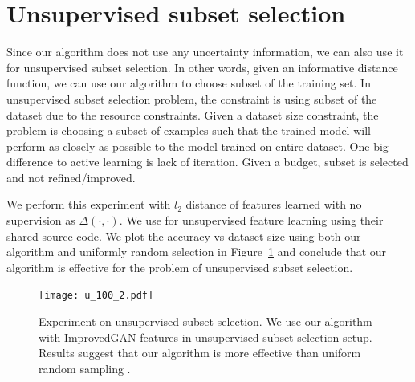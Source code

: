 \documentclass{article}
\begin{document}
 


\appendix

\section{Unsupervised subset selection} 

Since our algorithm does not use any uncertainty information, we can also use it for unsupervised subset selection. In other words, given an informative distance function, we can use our algorithm to choose subset of the training set. In unsupervised subset selection problem, the constraint is using subset of the dataset due to the resource constraints. Given a dataset size constraint, the problem is choosing a subset of examples such that the trained model will perform as closely as possible to the model trained on entire dataset. One big difference to active learning is lack of iteration. Given a budget, subset is selected and not refined/improved.


We perform this experiment with $l_2$ distance of features learned with no supervision as $\Delta(\cdot,\cdot)$. We use \cite{improved_gan} for unsupervised feature learning using their shared source code. We plot the accuracy vs dataset size using both our algorithm and uniformly random selection in Figure~\ref{fig:scat} and conclude that our algorithm is effective for the problem of unsupervised subset selection.  

\begin{figure}
\texttt{[image: u\_100\_2.pdf]}
\caption{Experiment on unsupervised subset selection. We use our algorithm with ImprovedGAN\cite{improved_gan} features in unsupervised subset selection setup. Results suggest that our algorithm is more effective than uniform random sampling .}
\label{fig:scat}
\end{figure}
\end{document}

